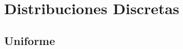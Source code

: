 \documentclass[12pt, fleqn]{report}                             %
\theoremstyle{break}                                            %
\begin{document}
        \clearpage
        \section{Distribuciones Discretas}


            \subsection{Uniforme}
\end{document}
